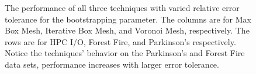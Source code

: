 \documentclass[smallextended]{svjour3}       %
\begin{document}
\begin{figure}
  \caption{The performance of all three techniques with varied relative error tolerance for the bootstrapping parameter. The columns are for Max Box Mesh, Iterative Box Mesh, and Voronoi Mesh, respectively. The rows are for HPC I/O, Forest Fire, and Parkinson's respectively. Notice the techniques' behavior on the Parkinson's and Forest Fire data sets, performance increases with larger error tolerance.}
  \label{fig_all_performance}
\end{figure}
\end{document}
